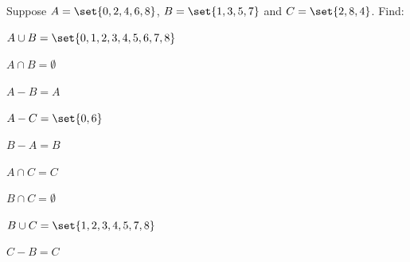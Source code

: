 \documentclass[DIN, pagenumber=false, fontsize=11pt, parskip=half]{scrartcl}
\begin{document}
\begin{problems}
    \problem Suppose $A = \set{0,2,4,6,8}$, $B = \set{1,3,5,7}$ and $C = \set{2,8,4}$. Find:
    \begin{parts}
        \item $A \cup B = \set{0,1,2,3,4,5,6,7,8}$
        \item $A \cap B = \emptyset$
        \item $A - B = A$
        \item $A - C = \set{0,6}$
        \item $B - A = B$
        \item $A \cap C = C$
        \item $B \cap C = \emptyset$
        \item $B \cup C = \set{1,2,3,4,5,7,8}$
        \item $C - B = C$
    \end{parts}


\end{problems}
\end{document}
